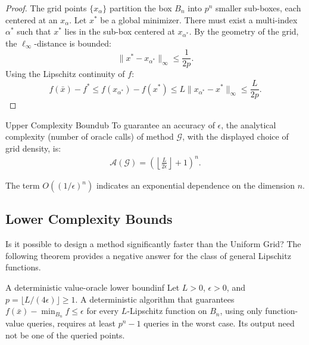\documentclass[11pt]{article}
\begin{document}
\begin{proof}
The grid points $\{x_\alpha\}$ partition the box $B_n$ into $p^n$ smaller sub-boxes, each centered at an $x_\alpha$. Let $x^*$ be a global minimizer. There must exist a multi-index $\alpha^*$ such that $x^*$ lies in the sub-box centered at $x_{\alpha^*}$. 
By the geometry of the grid, the $\ell_\infty$-distance is bounded:
\[ \|x^* - x_{\alpha^*}\|_\infty \leq \frac{1}{2p}. \]
Using the Lipschitz continuity of $f$:
\[ f(\bar{x}) - f^* \leq f(x_{\alpha^*}) - f(x^*) \leq L \|x_{\alpha^*} - x^*\|_\infty \leq \frac{L}{2p}. \]
\end{proof}

\begin{corollary}{Upper Complexity Bound}{ub}
To guarantee an accuracy of $\epsilon$, the analytical complexity (number of oracle calls) of method $\mathcal{G}$, with the displayed choice of grid density, is:
\begin{align*}
    \mathcal{A}(\mathcal{G}) = \left( \left\lfloor \frac{L}{2\epsilon} \right\rfloor + 1 \right)^n.
\end{align*}
\end{corollary}

\begin{remark}
    The term $O((1/\epsilon)^n)$ indicates an exponential dependence on the dimension $n$.
\end{remark}

\subsection{Lower Complexity Bounds}

Is it possible to design a method significantly faster than the Uniform Grid? The following theorem provides a negative answer for the class of general Lipschitz functions.

\begin{theorem}{A deterministic value-oracle lower bound}{inf}
Let $L>0$, $\epsilon>0$, and $p=\lfloor L/(4\epsilon)\rfloor\ge1$. A deterministic algorithm that guarantees $f(\bar x)-\min_{B_n}f\le\epsilon$ for every $L$-Lipschitz function on $B_n$, using only function-value queries, requires at least $p^n-1$ queries in the worst case. Its output need not be one of the queried points.
\end{theorem}
\end{document}
